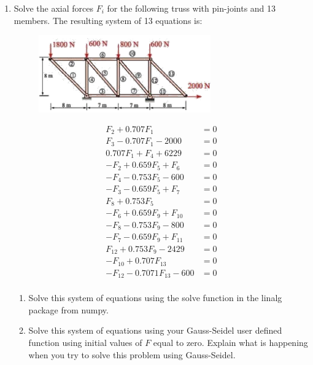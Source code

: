 \documentclass[a4paper,12pt]{article}
\begin{document}
\begin{enumerate}
	\item Solve the  axial forces $F_i$ for the following truss with pin-joints and 13 members. The resulting system of 13 equations is:
	\begin{figure}[ht]
		\centering
		\includegraphics[width=0.7\textwidth]{truss.png}
	\end{figure}
	\begin{align*}
	F_2 + 0.707 F_1 & = 0    \\
	F_3 - 0.707 F_1 - 2000 & = 0\\
	0.707F_1 + F_4 + 6229 & = 0 \\
	-F_2 + 0.659F_5 + F_6 & = 0 \\
	-F_4 - 0.753 F_5 - 600 &  = 0 \\
	-F_3 -0.659F_5 + F_7 & = 0 \\
	F_8 + 0.753F_5 & = 0 \\
	-F_6 + 0.659 F_9 + F_{10} & = 0 \\
	-F_8 -0.753 F_9 - 800 &= 0 \\
	-F_7 -0.659F_9 + F_{11} &= 0 \\
	F_{12} + 0.753 F_9 - 2429 &= 0 \\
	-F_{10} + 0.707 F_{13} & = 0 \\
	-F_{12} - 0.7071 F_{13} - 600 &= 0\\
	\end{align*}
	
	\begin{enumerate}
		\item Solve this system of equations using the solve function in the linalg package from
numpy.
		\item Solve this system of equations using your Gauss-Seidel user defined function using
initial values of $F$ equal to zero. Explain what is happening when you try to solve this
problem using Gauss-Seidel.

	\end{enumerate}
\end{enumerate}
\end{document}
